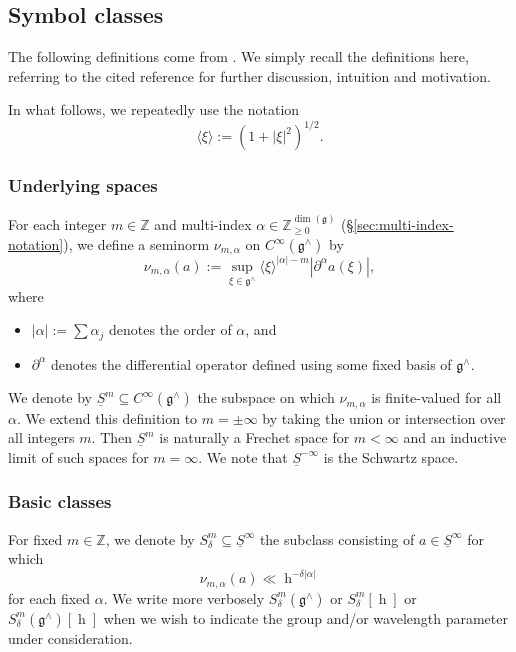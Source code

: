 \documentclass[reqno]{amsart}
\DeclareMathOperator{\h}{h}
\theoremstyle{plain} \newtheorem{theorem} {Theorem}
\theoremstyle{definition} \newtheorem{definition} [theorem] {Definition}
\theoremstyle{itplain} %
\numberwithin{equation}{section}
\numberwithin{theorem}{section}
\renewcommand{\geq}{\geqslant}
\begin{document}
\subsection{Symbol classes}
The following definitions come from \cite[\S9]{2020arXiv201202187N}.  We simply recall the definitions here, referring to the cited reference for further discussion, intuition and motivation.

In what follows, we repeatedly use the notation
\begin{equation*}
\langle \xi \rangle := (1 + |\xi|^2)^{1/2}.
\end{equation*}

\subsubsection{Underlying spaces}
For each integer $m \in \mathbb{Z}$ and multi-index $\alpha \in \mathbb{Z}_{\geq 0}^{\dim(\mathfrak{g})}$ (\S\ref{sec:multi-index-notation}), we define a seminorm $\nu_{m,\alpha}$ on $C^\infty(\mathfrak{g}^\wedge)$ by
\[\nu_{m,\alpha}(a) := \sup_{\xi \in \mathfrak{g}^\wedge}
  \langle \xi \rangle^{|\alpha| - m} \left\lvert \partial^\alpha a(\xi) \right\rvert,
\]
where
\begin{itemize}
\item $|\alpha| := \sum \alpha_j$ denotes the order of $\alpha$, and
\item $\partial^\alpha$ denotes the differential operator defined using some fixed basis of $\mathfrak{g}^\wedge$.
\end{itemize}

We denote by  $\underline{S}^m \subseteq C^\infty(\mathfrak{g}^\wedge)$ the subspace on which $\nu_{m,\alpha}$ is finite-valued for all $\alpha$.  We extend this definition to $m = \pm \infty$ by taking the union or intersection over all integers $m$.  Then $\underline{S}^m$ is naturally a Frechet space for $m < \infty$ and an inductive limit of such spaces for $m = \infty$.  We note that $\underline{S}^{-\infty}$ is the Schwartz space.

\subsubsection{Basic classes}
For fixed $m \in \mathbb{Z}$, we denote by  $S^m_\delta \subseteq \underline{S}^{\infty}$ the subclass consisting of $a \in \underline{S}^\infty$ for which
\begin{equation*}
\nu_{m,\alpha}(a) \ll \h^{-\delta |\alpha|}
\end{equation*}
for each fixed $\alpha$.  We write more verbosely $S_\delta^m(\mathfrak{g}^\wedge)$ or $S_\delta^m[\h]$ or $S_\delta^m(\mathfrak{g}^\wedge)[\h]$ when we wish to indicate the group and/or wavelength parameter under consideration.
\end{document}
